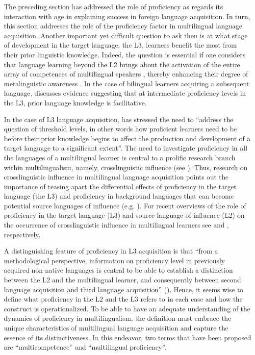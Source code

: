 \documentclass[output=paper]{../langscibook}
\begin{document}
The preceding section has addressed the role of proficiency as regards its interaction with age in explaining success in foreign language acquisition. In turn, this section addresses the role of the proficiency factor in multilingual language acquisition. Another important yet difficult question to ask then is at what stage of development in the target language, the L3, learners benefit the most from their prior linguistic knowledge. Indeed, the question is essential if one considers that language learning beyond the L2 brings about the activation of the entire array of competences of multilingual speakers \citep{Coste1997}, thereby enhancing their degree of metalinguistic awareness \citep{Jessner2008Knowledge}. In the case of bilingual learners acquiring a subsequent language, \citet{Cenoz2013} discusses evidence suggesting that at intermediate proficiency levels in the L3, prior language knowledge is facilitative.

In the case of L3 language acquisition, \citet[34]{DeAngelis2007} has stressed the need to “address the question of threshold levels, in other words how proficient learners need to be before their prior knowledge begins to affect the production and development of a target language to a significant extent”. The need to investigate proficiency in all the languages of a multilingual learner is central to a prolific research branch within multilingualism, namely, crosslinguistic influence (see ). Thus, research on crosslinguistic influence in multilingual language acquisition points out the importance of teasing apart the differential effects of proficiency in the target language (the L3) and proficiency in background languages that can become potential source languages of influence (e.g. \citealt{BardelLindqvist2007, DeAngelis2007, FalkBardel2010, Jaensch2011, LindqvistBardel2013, SánchezBardel2016}). For recent overviews of the role of proficiency in the target language (L3) and source language of influence (L2) on the occurrence of crosslinguistic influence in multilingual learners see \citet{Sánchez2014} and \citet{SánchezBardel2017}, respectively.

A distinguishing feature of proficiency in L3 acquisition is that “from a methodological perspective, information on proficiency level in previously acquired non-native languages is central to be able to establish a distinction between the L2 and the multilingual learner, and consequently between second language acquisition and third language acquisition” (\citealt[34]{DeAngelis2007}). Hence, it seems wise to define what proficiency in the L2 and the L3 refers to in each case and how the construct is operationalized. To be able to have an adequate understanding of the dynamics of proficiency in multilingualism, the definition must embrace the unique characteristics of multilingual language acquisition and capture the essence of its distinctiveness. In this endeavor, two terms that have been proposed are ``multicompetence'' \citep{Cook1995} and ``multilingual proficiency''.
\end{document}
